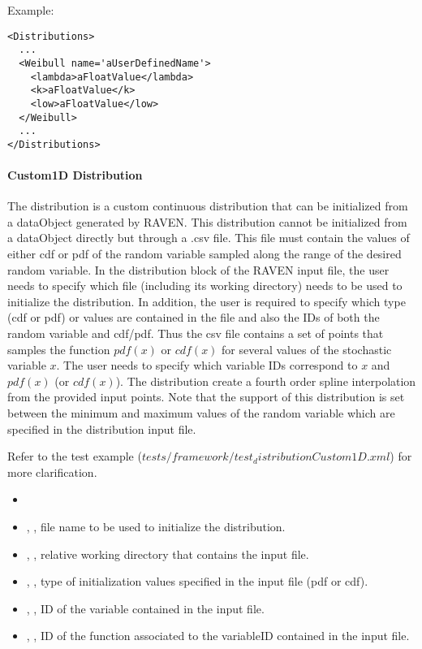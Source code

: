 Example:
\begin{lstlisting}[style=XML]
<Distributions>
  ...
  <Weibull name='aUserDefinedName'>
    <lambda>aFloatValue</lambda>
    <k>aFloatValue</k>
    <low>aFloatValue</low>
  </Weibull>
  ...
</Distributions>
\end{lstlisting}

\paragraph{Custom1D Distribution}
\label{Custom1D}
The  distribution is a custom continuous distribution that can be initialized from a dataObject
generated by RAVEN.
This distribution cannot be initialized from a dataObject directly but through a .csv file.
This file must contain the values of either cdf or pdf of the random variable sampled along the range of the desired
random variable.
In the distribution block of the RAVEN input file, the user needs to specify which file (including its working directory)
needs to be used to initialize the distribution. In addition, the user is required to specify which type (cdf or pdf) or values
are contained in the file and also the IDs of both the random variable and cdf/pdf.
Thus the csv file contains a set of points that samples the function $pdf(x)$ or $cdf(x)$ for several values of the stochastic variable $x$.
The user needs to specify which variable IDs correspond to $x$ and $pdf(x)$ (or $cdf(x)$).
The distribution create a fourth order spline interpolation from the provided input points.
%
Note that the support of this distribution is set between the minimum and maximum values of the random variable which are
specified in the distribution input file.

Refer to the test example ($tests/framework/test_distributionCustom1D.xml$) for more clarification.

%
\attrIntro
\vspace{-5mm}
\begin{itemize}
  \itemsep0em
  \item \nameDescription
\end{itemize}
\vspace{-5mm}
\subnodesIntro
\begin{itemize}
  \item {}, , file name to be used to initialize the distribution.
  \item {}, , relative working directory that contains the input file.
  \item {}, , type of initialization values specified in the input file (pdf or cdf).
  \item {}, , ID of the variable contained in the input file.
  \item {}, , ID of the function associated to the variableID contained in the input file.
\end{itemize}

